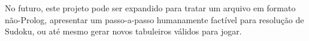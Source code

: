 \documentclass[journal,transmag]{IEEEtran}
\begin{document}
No futuro, este projeto pode ser expandido para tratar um arquivo em formato
não-Prolog, apresentar um passo-a-passo humanamente factível para resolução de
Sudoku, ou até mesmo gerar novos tabuleiros válidos para jogar.




%
%



%
%
\end{document}
